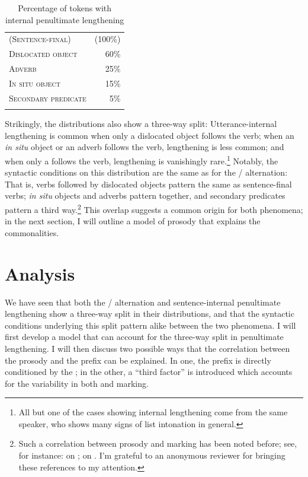 \documentclass[output=paper 
,modfonts
,nonflat]{langsci/langscibook}
\begin{document}
\begin{table}
	\caption{Percentage of tokens with internal penultimate lengthening}
	\label{tab:kusmer:lengthening_percentages}
\begin{tabular}{lr}
	\lsptoprule
	\textsc{(Sentence-final)} & (100\%)\\
	\textsc{Dislocated object} & 60\%\\
	\midrule
	\textsc{Adverb} & 25\%\\
	\textsc{In situ object} & 15\%\\
	\midrule
	\textsc{Secondary predicate} & 5\%\\
\lspbottomrule
\end{tabular}
\end{table}

Strikingly, the distributions also show a three-way split: Utterance-internal
lengthening is common when only a dislocated object follows the verb; when an
\textit{in situ} object or an adverb follows the verb, lengthening is less
common; and when only a  follows the verb, lengthening is
vanishingly rare.\footnote{All but one of the  cases showing
internal lengthening come from the same speaker, who shows many signs of list
intonation in general.} Notably, the syntactic conditions on this distribution
are the same as for the \slash {} alternation: That is, verbs
followed by dislocated objects pattern the same as sentence-final verbs;
\textit{in situ} objects and adverbs pattern together, and secondary predicates
pattern a third way.\footnote{Such a correlation between prosody and 
marking has been noted before; see, for instance: \cite{vanderSpuy1993,
Buell2005, chengdowning2012} on ; \cite{Devos2008} on . I'm grateful
to an anonymous reviewer for bringing these references to my attention.} This
overlap suggests a common origin for both phenomena; in the next section, I
will outline a model of  prosody that explains the commonalities.

\section{Analysis}\label{sec:kusmer:analysis}

We have seen that both the \slash {} alternation and
sentence-internal penultimate lengthening show a three-way split in their
distributions, and that the syntactic conditions underlying this split pattern
alike between the two phenomena. I will first develop a model that can account
for the three-way split in penultimate lengthening. I will then discuss two
possible ways that the correlation between the prosody and the  prefix
can be explained. In one, the  prefix is directly conditioned by the
; in the other, a ``third factor'' is introduced which
accounts for the variability in both  and 
marking.
\end{document}
